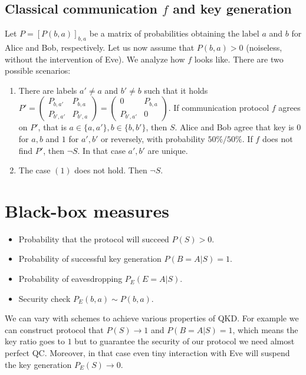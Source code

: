 \documentclass[12pt,a4paper,reqno, aps, superscriptaddress]{amsart}
\begin{document}
\subsection{Classical communication $f$ and key generation}\label{sec-c-communication}
Let $P = [P(b,a)]_{b,a}$ be a matrix of probabilities obtaining the label $a$ and $b$ for  Alice and Bob, respectively. Let us now assume that $P(b,a) > 0$ (noiseless, without the intervention of Eve). We analyze how $f$ looks like. There are two possible scenarios:
\begin{enumerate}
    \item There are labels $a' \neq a$ and $b' \neq b$ such that it holds $P' = \begin{pmatrix} P_{b,a'} & P_{b,a} \\
    P_{b',a'} & P_{b',a} \end{pmatrix}= \begin{pmatrix} 0 & P_{b,a} \\
    P_{b',a'} & 0 \end{pmatrix}$. If communication protocol $f$ agrees on $P'$, that is $a \in \{a,a'\}, b \in \{b,b'\}$, then $S$. Alice and Bob agree that key is $0$ for $a,b$ and $1$ for $a',b'$ or reversely, with probability $50\%/50\%$. If $f$ does not find $P'$, then $\neg S$. In that case $a',b'$ are unique.
    \item The case $(1)$ does not hold. Then $\neg S$.
\end{enumerate}



\section{Black-box measures}\label{sec-measures}
\begin{itemize}
    \item Probability that the protocol will succeed $P(S)>0$.
    \item Probability of successful key generation $P(B=A|S)=1$.
    \item Probability of eavesdropping $P_E(E=A|S)$.
    \item Security check $P_E(b,a) \sim P(b,a)$.
\end{itemize}

We can vary with schemes to achieve various properties of QKD. For example we can construct protocol that $P(S) \to 1$ and $P(B=A|S) = 1$, which means the key ratio goes to $1$ but to guarantee the security of our protocol we need almost perfect QC. Moreover, in that case even tiny interaction with Eve will suspend the key generation $P_E(S) \to 0$. 
\end{document}
